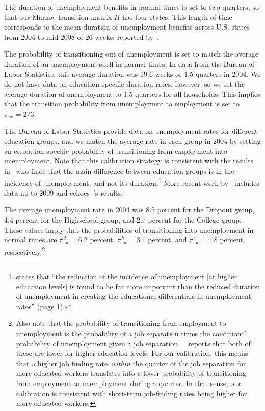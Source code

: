 \documentclass[qe]{econsocart}
\begin{document}
The duration of unemployment benefits in normal times is set to two quarters, so that our Markov transition matrix $\Pi$ has four states.
This length of time corresponds to the mean duration of unemployment benefits across U.S.
states from 2004 to mid-2008 of 26 weeks, reported by~\cite{rothstein2017scraping}.

The probability of transitioning out of unemployment is set to match the average duration of an unemployment spell in normal times.
In data from the Bureau of Labor Statistics, this average duration was 19.6 weeks or 1.5 quarters in 2004. We do not have data on  education-specific duration rates, however, so we set the average duration of unemployment to 1.5 quarters for all households. This implies that the transition probability from unemployment to employment is set to $\pi_{ue}=2/3$.

The Bureau of Labor Statistics provide data on unemployment rates for different education groups, and we match the average rate in each group in 2004 by setting an education-specific probability of transitioning from employment into unemployment.
Note that this calibration strategy is consistent with the results in~\cite{mincer1991education} who finds that the main difference between education groups is in the incidence of unemployment, and not its duration.\footnote{\cite{mincer1991education} states that ``the reduction of the incidence of unemployment [at higher education levels] is found to be far more important than the reduced duration of unemployment in creating the educational differentials in unemployment rates'' (page 1).} More recent work by~\cite{elsby2010labor} includes data up to 2009 and echoes~\citeauthor{mincer1991education}'s results.

The average unemployment rate in 2004 was 8.5 percent for the Dropout group, 4.4 percent for the Highschool group, and 2.7 percent for the College group.
These values imply that the probabilities of transitioning into unemployment in normal times are $\pi_{eu}^d=6.2$ percent, $\pi_{eu}^h=3.1$ percent, and $\pi_{eu}^c=1.8$ percent, respectively.\footnote{Also note that the probability of transitioning from employment to unemployment is the probability of a job separation times the conditional probability of unemployment given a job separation.
  ~\cite{mincer1991education} reports that both of these are lower for higher education levels.
  For our calibration, this means that a higher job finding rate~\textit{within} the quarter of the job separation for more educated workers translates	into a lower probability of transitioning from employment to unemployment during a quarter.
  In that sense, our calibration is consistent with short-term job-finding rates being higher for more educated workers.}
\end{document}
